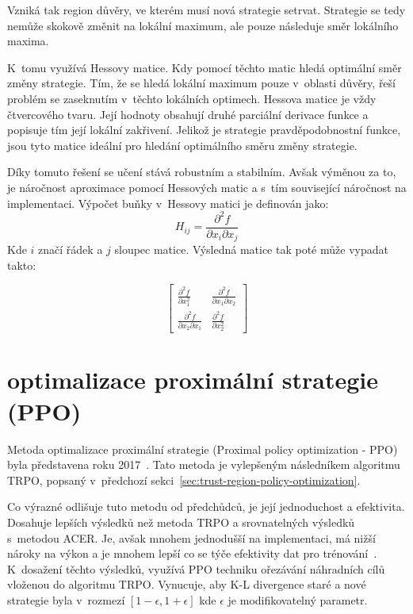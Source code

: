 Vzniká tak region důvěry, ve kterém musí nová strategie setrvat.
Strategie se tedy nemůže skokově změnit na lokální maximum, ale pouze následuje směr lokálního maxima.

K~tomu využívá Hessovy matice.
Kdy pomocí těchto matic hledá optimální směr změny strategie.
Tím, že se hledá lokální maximum pouze v~oblasti důvěry, řeší problém se zaseknutím v~těchto lokálních optimech.
Hessova matice je vždy čtvercového tvaru.
Její hodnoty obsahují druhé parciální derivace funkce a popisuje tím její lokální zakřivení.
Jelikož je strategie pravděpodobnostní funkce, jsou tyto matice ideální pro hledání optimálního směru změny strategie.

Díky tomuto řešení se učení stává robustním a stabilním.
Avšak výměnou za to, je náročnost aproximace pomocí Hessových matic a s~tím související náročnost na implementaci.
Výpočet buňky v~Hessovy matici je definován jako:
\begin{equation}
  H_{ij} = \frac{\partial^2 f}{\partial x_i \partial x_j}
\end{equation}
Kde $i$ značí řádek a $j$ sloupec matice.
Výsledná matice tak poté může vypadat takto:

\begin{equation}
  \begin{bmatrix}
     \frac{\partial^2 f}{\partial x_1^2} & \frac{\partial^2 f}{\partial x_1 \partial x_2} \\
     \frac{\partial^2 f}{\partial x_2 \partial x_1} & \frac{\partial^2 f}{\partial x_2^2}
   \end{bmatrix}
\end{equation}

\section{optimalizace proximální strategie (PPO)}
\label{sec:proximalni-optimalizace-strategie}


Metoda optimalizace proximální strategie (Proximal policy optimization - PPO) byla představena roku 2017~\cite{PPO_paper}.
Tato metoda je vylepšeným následníkem algoritmu TRPO, popsaný v~předchozí sekci~\ref{sec:trust-region-policy-optimization}.

Co výrazné odlišuje tuto metodu od předchůdců, je její jednoduchost a efektivita.
Dosahuje lepších výsledků než metoda TRPO a srovnatelných výsledků s~metodou ACER\@.
Je, avšak mnohem jednodušší na implementaci, má nižší nároky na výkon a je mnohem lepší co se týče efektivity dat pro trénování~\cite{PPO_paper}.
K~dosažení těchto výsledků, využívá PPO techniku ořezávání náhradních cílů vloženou do algoritmu TRPO\@.
Vynucuje, aby K-L divergence staré a nové strategie byla v~rozmezí $[1-\epsilon, 1+\epsilon]$ kde $\epsilon$ je modifikovatelný parametr.

